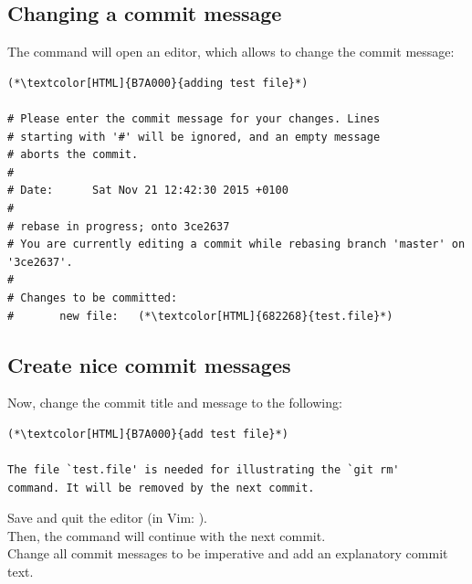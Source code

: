 \subsection{Changing a commit message}
\begin{frame}[fragile]
  \subslidetitle

  The  command will open an editor, which allows to change the commit message:
  \begin{lstlisting}
(*\textcolor[HTML]{B7A000}{adding test file}*)

# Please enter the commit message for your changes. Lines
# starting with '#' will be ignored, and an empty message
# aborts the commit.
#
# Date:      Sat Nov 21 12:42:30 2015 +0100
#
# rebase in progress; onto 3ce2637
# You are currently editing a commit while rebasing branch 'master' on '3ce2637'.
#
# Changes to be committed:
#       new file:   (*\textcolor[HTML]{682268}{test.file}*)
\end{lstlisting}

\end{frame}

\subsection{Create nice commit messages}
\begin{frame}[fragile]
  \subslidetitle

  Now, change the commit title and message to the following:
  \begin{lstlisting}
(*\textcolor[HTML]{B7A000}{add test file}*)

The file `test.file' is needed for illustrating the `git rm'
command. It will be removed by the next commit.

\end{lstlisting}

  Save and quit the editor (in Vim: ).
  \\
  \vspace{1em}
  Then, the  command will continue with the next commit.
  \\
  \vspace{1em}
  Change all commit messages to be imperative and add an explanatory commit text.
\end{frame}
